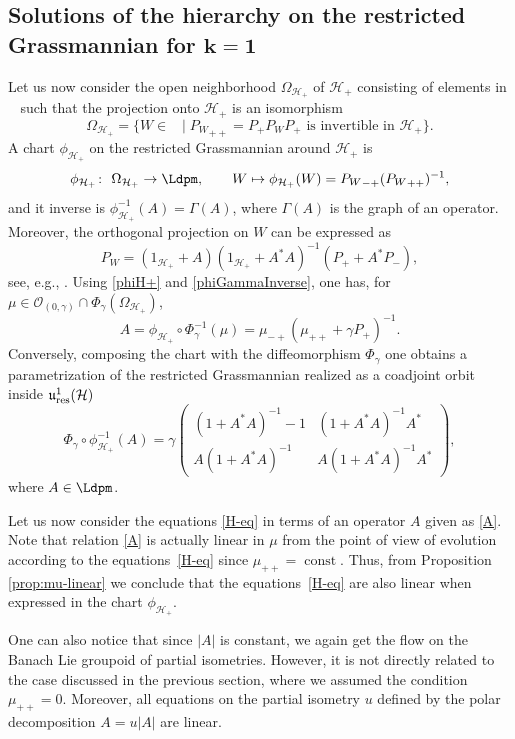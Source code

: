 \documentclass[pdftex]{sigma}
\theoremstyle{definition}
\numberwithin{equation}{section}
\renewcommand{\H}{\mathcal{H}}
\DeclareMathOperator{\Gr}{Gr_{res}(\H,\H_+)}
\newcommand{\urp}{\mathfrak u_{\textnormal{res}}^1(\H)}
\DeclareMathOperator{\const}{const}
\newcommand{\abs}[1]{\left\vert#1\right\vert}
\renewcommand{\to}{\rightarrow}
\newcommand{\be}{\begin{equation}}
\newcommand{\ee}{\end{equation}}
\begin{document}
\subsection[Solutions of the hierarchy on the restricted Grassmannian for k = 1]{Solutions of the hierarchy on the restricted Grassmannian for $\boldsymbol{k = 1}$}
Let us now consider the open neighborhood $\Omega_{\H_+}$ of $\H_+$ consisting of elements in $\Gr$ such that the projection onto $\H_+$ is an isomorphism
\[
\Omega_{\H_+}= \{ W \in \Gr \mid {P_W}_{++}= P_+ P_W P_+ \textrm{ is invertible in } \H_+\}.
\]
A chart $\phi_{\H_+}$ on the restricted Grassmannian around $\H_+$ is
\be \label{phiH+}
\phi_{\H_+}\colon\ \Omega_{\H_+} \to \Ldpm,\qquad
 W \mapsto \phi_{\H_+}(W)= {P_W}_{-+}({P_W}_{++})^{-1},
\ee
and it inverse is
$\phi_{\H_+}^{-1}(A) = \Gamma(A)$,
where $\Gamma(A)$ is the graph of an operator. Moreover, the orthogonal projection on $W$ can be expressed as
\[ P_W = (1_{\H_+} + A)(1_{\H_+}+A^*A)^{-1}(P_+ + A^* P_-),\]
see, e.g., \cite{GJS-partiso}. Using \eqref{phiH+} and \eqref{phiGammaInverse}, one has, for $\mu \in \mathcal O_{(0,\gamma)}\cap \Phi_\gamma(\Omega_{\H_+})$,
\be \label{A} A = \phi_{\H_+}\circ\Phi_\gamma^{-1}(\mu) =
\mu_{-+}(\mu_{++}+\gamma P_+)^{-1}.\ee
Conversely, composing the chart \smash{$\phi_{\H_+}^{-1} $} with the diffeomorphism $\Phi_\gamma$ one obtains a parametrization of the restricted Grassmannian realized as a coadjoint orbit inside $\urp$
\be \label{coord}
\Phi_\gamma\circ\phi_{\H_+}^{-1}(A) = \gamma\left(
\begin{matrix}
 (1+A^*A)^{-1} - 1& (1+A^*A)^{-1}A^*\\
 A(1+A^*A)^{-1} & A(1+A^*A)^{-1}A^*
\end{matrix}
\right),
\ee
where $A\in \Ldpm$.

Let us now consider the equations \eqref{H-eq} in terms of an operator $A$ given as \eqref{A}. Note that relation \eqref{A} is actually linear in $\mu$ from the point of view of evolution according to the equations~\eqref{H-eq} since $\mu_{++}=\const$. Thus, from Proposition \ref{prop:mu-linear} we conclude that the equations~\eqref{H-eq} are also linear when expressed in the chart $\phi_{\H_+}$.

One can also notice that since $\abs A$ is constant, we again get the flow on the Banach Lie groupoid of partial isometries. However, it is not directly related to the case discussed in the previous section, where we assumed the condition $\mu_{++}=0$. Moreover, all equations on the partial isometry $u$ defined by the polar decomposition $A=u\abs A$ are linear.
\end{document}
